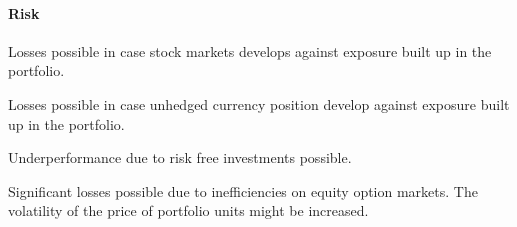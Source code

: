 \documentclass[11pt, parskip=full, DIV=14]{scrreprt}
\begin{document}
\begin{minipage}[t]{0.49\textwidth}
  \paragraph{Risk}
  \begin{sit}
    \item Losses possible in case stock markets develops against exposure built up in the portfolio.
    \item Losses possible in case unhedged currency position develop against exposure built up in the portfolio.
    \item Underperformance due to risk free investments possible.
    \item Significant losses possible due to inefficiencies on equity option markets. The volatility of the price of portfolio units might be increased.
  \end{sit}
\end{minipage}
\end{document}
